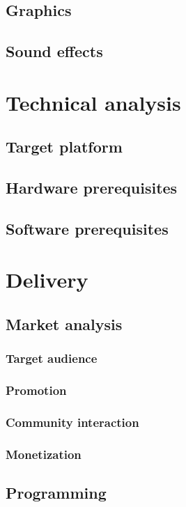 \documentclass{article}[10pt]
\begin{document}
\subsection{Graphics}
\subsection{Sound effects}
\pagebreak

\section{Technical analysis}
\subsection{Target platform}
\subsection{Hardware prerequisites}
\subsection{Software prerequisites}
\pagebreak

\section{Delivery}
\subsection{Market analysis}
\subsubsection{Target audience}
\subsubsection{Promotion}
\subsubsection{Community interaction}
\subsubsection{Monetization}

\subsection{Programming}
\end{document}
